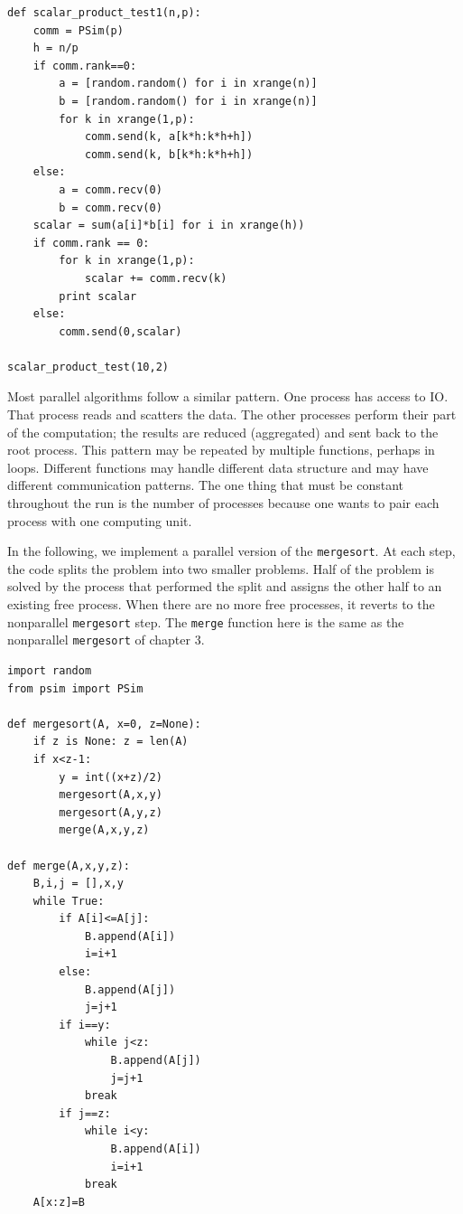 \documentclass[justified,sixbynine]{tufte-book}
\def\ft{\small\tt}
\theoremstyle{plain}%
\theoremstyle{definition}
\theoremstyle{remark}
\begin{document}
\begin{fullwidth}
\begin{lstlisting}[caption={in file: {\ft psim\_scalar.py}}]
def scalar_product_test1(n,p):
    comm = PSim(p)
    h = n/p
    if comm.rank==0:
        a = [random.random() for i in xrange(n)]
        b = [random.random() for i in xrange(n)]
        for k in xrange(1,p):
            comm.send(k, a[k*h:k*h+h])
            comm.send(k, b[k*h:k*h+h])
    else:
        a = comm.recv(0)
        b = comm.recv(0)
    scalar = sum(a[i]*b[i] for i in xrange(h))
    if comm.rank == 0:
        for k in xrange(1,p):
            scalar += comm.recv(k)
        print scalar
    else:
        comm.send(0,scalar)

scalar_product_test(10,2)
\end{lstlisting}

Most parallel algorithms follow a similar pattern. One process has access to IO. That process reads and scatters the data. The other processes perform their part of the computation; the results are reduced (aggregated) and sent back to the root process. This pattern may be repeated by multiple functions, perhaps in loops. Different functions may handle different data structure and may have different communication patterns. The one thing that must be constant throughout the run is the number of processes because one wants to pair each process with one computing unit.

 In the following, we implement a parallel version of the {\ft mergesort}. At each step, the code splits the problem into two smaller problems. Half of the problem is solved by the process that performed the split and assigns the other half to an existing free process. When there are no more free processes, it reverts to the nonparallel {\ft mergesort} step. The {\ft merge} function here is the same as the nonparallel {\ft mergesort} of chapter 3.


\begin{lstlisting}[caption={in file: {\ft psim\_mergesort.py}}]
import random
from psim import PSim

def mergesort(A, x=0, z=None):
    if z is None: z = len(A)
    if x<z-1:
        y = int((x+z)/2)
        mergesort(A,x,y)
        mergesort(A,y,z)
        merge(A,x,y,z)

def merge(A,x,y,z):
    B,i,j = [],x,y
    while True:
        if A[i]<=A[j]:
            B.append(A[i])
            i=i+1
        else:
            B.append(A[j])
            j=j+1
        if i==y:
            while j<z:
                B.append(A[j])
                j=j+1
            break
        if j==z:
            while i<y:
                B.append(A[i])
                i=i+1
            break
    A[x:z]=B


\end{lstlisting}
\end{fullwidth}
\end{document}
